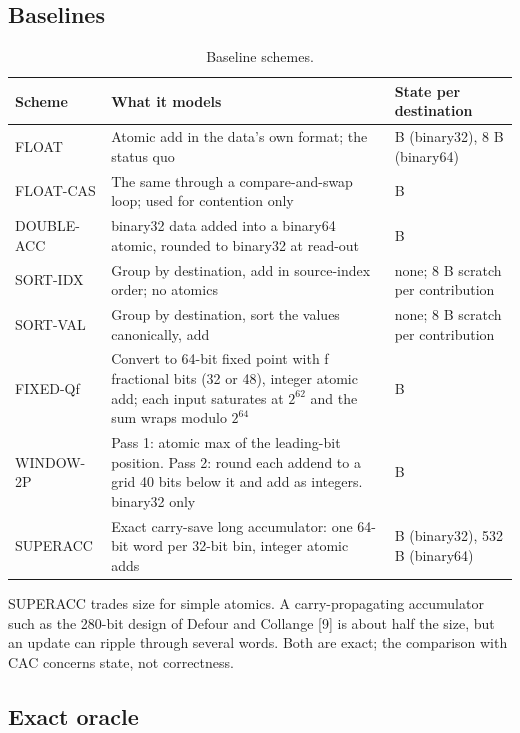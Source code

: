 \documentclass[journal]{IEEEtran}
\begin{document}
\hypertarget{baselines}{%
\subsection{Baselines}\label{baselines}}

\begin{table}[!htbp]\centering\small\setlength{\tabcolsep}{4pt}
\caption{Baseline schemes.}\label{tab:8}
\begin{tabularx}{\linewidth}{>{\raggedright\arraybackslash\hsize=0.488\hsize}X>{\raggedright\arraybackslash\hsize=1.326\hsize}X>{\raggedright\arraybackslash\hsize=1.186\hsize}X}
\toprule
Scheme & What it models & State per destination \\
\midrule
FLOAT & Atomic add in the data's own format; the status quo & 4 B (binary32), 8 B (binary64) \\
FLOAT-CAS & The same through a compare-and-swap loop; used for contention only & 4 B \\
DOUBLE-ACC & binary32 data added into a binary64 atomic, rounded to binary32 at
read-out & 8 B \\
SORT-IDX & Group by destination, add in source-index order; no atomics & none; 8 B scratch per contribution \\
SORT-VAL & Group by destination, sort the values canonically, add & none; 8 B scratch per contribution \\
FIXED-Qf & Convert to 64-bit fixed point with f fractional bits (32 or 48), integer
atomic add; each input saturates at \(2^{62}\) and the sum wraps modulo
\(2^{64}\) & 8 B \\
WINDOW-2P & Pass 1: atomic max of the leading-bit position. Pass 2: round each
addend to a grid 40 bits below it and add as integers. binary32 only & 16 B \\
SUPERACC & Exact carry-save long accumulator: one 64-bit word per 32-bit bin,
integer atomic adds & 76 B (binary32), 532 B (binary64) \\
\bottomrule
\end{tabularx}
\end{table}

SUPERACC trades size for simple atomics. A carry-propagating accumulator
such as the 280-bit design of Defour and Collange {[}9{]} is about half
the size, but an update can ripple through several words. Both are
exact; the comparison with CAC concerns state, not correctness.

\hypertarget{exact-oracle}{%
\subsection{Exact oracle}\label{exact-oracle}}
\end{document}

